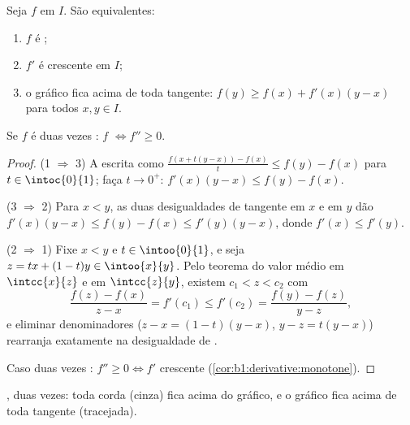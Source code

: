 \begin{theorem}\label{thm:b1:derivative:convexchar}
Seja $f$  em $I$. São equivalentes:
\begin{enumerate}
  \item $f$ é ;
  \item $f'$ é crescente em $I$;
  \item o gráfico fica acima de toda tangente: $f(y) \geq f(x) +
        f'(x)(y - x)$ para todos $x, y \in I$.
\end{enumerate}
Se $f$ é duas vezes : $f$  $\iff f'' \geq 0$.
\end{theorem}

\begin{proof}
(1 $\Rightarrow$ 3) A  escrita como $\frac{f(x + t(y-x)) -
f(x)}{t} \leq f(y) - f(x)$ para $t \in \intoc{0}{1}$; faça $t \to 0^+$:
$f'(x)(y - x) \leq f(y) - f(x)$.

(3 $\Rightarrow$ 2) Para $x < y$, as duas desigualdades de tangente em $x$
e em $y$ dão $f'(x)(y-x) \leq f(y) - f(x) \leq f'(y)(y - x)$,
donde $f'(x) \leq f'(y)$.

(2 $\Rightarrow$ 1) Fixe $x < y$ e $t \in \intoo{0}{1}$, e seja $z
= tx + (1-t)y \in \intoo{x}{y}$. Pelo teorema do valor médio em
$\intcc{x}{z}$ e em $\intcc{z}{y}$, existem $c_1 < z < c_2$ com
\[
\frac{f(z) - f(x)}{z - x} = f'(c_1) \leq f'(c_2)
= \frac{f(y) - f(z)}{y - z} ,
\]
e eliminar denominadores ($z - x = (1-t)(y-x)$, $y - z = t(y-x)$)
rearranja exatamente na desigualdade de .

Caso duas vezes : $f'' \geq 0 \iff f'$ crescente
(\cref{cor:b1:derivative:monotone}).
\end{proof}

\begin{omfigure}

{\small {}, duas vezes: toda corda (cinza) fica acima do gráfico,
e o gráfico fica acima de toda tangente (tracejada).}
\end{omfigure}

